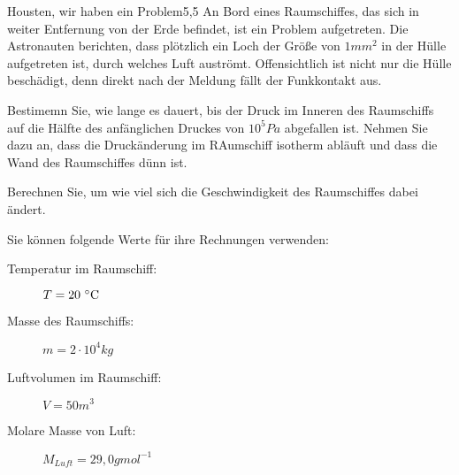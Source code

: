 \begin{problem}{Housten, wir haben ein Problem}{5,5}
An Bord eines Raumschiffes, das sich in weiter Entfernung von der Erde befindet, ist ein Problem aufgetreten.  Die Astronauten berichten, dass plötzlich ein Loch der Größe von $1\unit{mm^2}$ in der Hülle aufgetreten ist, durch welches Luft auströmt.  Offensichtlich ist nicht nur die Hülle beschädigt, denn direkt nach der Meldung fällt der Funkkontakt aus.
\begin{abcenum}
  \item Bestimemn Sie, wie lange es dauert, bis der Druck im Inneren des Raumschiffs auf die Hälfte des anfänglichen Druckes von $10^5\unit{Pa}$ abgefallen ist.  Nehmen Sie dazu an, dass die Druckänderung im RAumschiff isotherm abläuft und dass die Wand des Raumschiffes dünn ist.
  \item Berechnen Sie, um wie viel sich die Geschwindigkeit des Raumschiffes dabei ändert.
\end{abcenum}
Sie können folgende Werte für ihre Rechnungen verwenden:
\begin{description}
\item[Temperatur im Raumschiff:] $T=20\,\mathrm{\,^\circ\mathrm{C}}$
\item[Masse des Raumschiffs:] $m=2\cdot 10^4\unit{kg}$
\item[Luftvolumen im Raumschiff:] $V=50\unit{m^3}$
\item[Molare Masse von Luft:] $M_{Luft}=29,0\unit{g mol^{-1}}$
\end{description}
\begin{solution}
  
\end{solution}
\end{problem}

